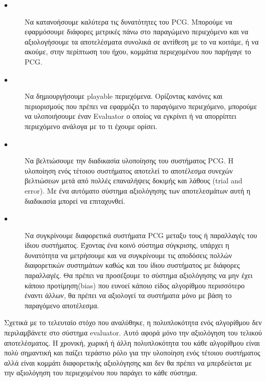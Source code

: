 \begin{description}
  \item[$\bullet$] Nα κατανοήσουμε καλύτερα τις δυνατότητες του PCG. Mπορούμε να εφαρμόσουμε διάφορες μετρικές πάνω στο παραγώμενο περιεχόμενο και να αξιολογήσουμε τα αποτελέσματα συνολικά σε αντίθεση με το να κοιτάμε, ή να ακούμε, στην περίπτωση του ήχου, κομμάτια περιεχομένου που παρήγαγε το PCG.
    \item[$\bullet$] Nα δημιουργήσουμε playable περιεχόμενα. Ορίζοντας κανόνες και περιορισμούς που πρέπει να εφαρμόζει το παραγόμενο περιεχόμενο, μπορούμε να υλοποιήσουμε έναν Εvaluator ο οποίος να εγκρίνει ή να απορρίπτει περιεχόμενο ανάλογα με το τι έχουμε ορίσει.
    \item[$\bullet$] Nα βελτιώσουμε την διαδικασία υλοποίησης του συστήματος PCG. Η υλοποίηση ενός τέτοιου συστήματος αποτελεί το αποτέλεσμα συνεχών βελτιώσεων μετά από πολλές επαναλήψεις δοκιμής και λάθους (trial and error). Με ένα αυτόματο σύστημα αξιολόγησης των αποτελεσμάτων αυτή η διαδικασία μπορεί να επιταχυνθεί.
    \item[$\bullet$] Nα συγκρίνουμε διαφορετικά συστήματα PCG μεταξυ τους ή παραλλαγές του ίδιου συστήματος. Έχοντας ένα κοινό σύστημα σύγκρισης, υπάρχει η δυνατότητα να μετρήσουμε και να συγκρίνουμε τις αποδόσεις πολλών διαφορετικών συστημάτων καθώς και του ίδιου συστήματος με διάφορες παραλλαγές. Θα πρέπει να προσέξουμε το σύστημα αξιολόγησης να μην έχει κάποιο προτίμηση(bias) που ευνοεί κάποιο είδος αλγορίθμου περισσότερο έναντι άλλων, θα πρέπει να αξιολογεί τα συστήματα μόνο με βάση το παραγόμενο αποτέλεσμα.
\end{description}
\par
Σχετικά με το τελευταίο στόχο που αναλύθηκε, η πολυπλοκότητα ενός αλγορίθμου δεν περιλαμβάνετε στο σύστημα evaluator. Αυτό αφορά μόνο την αξιολόγηση του τελικού αποτελέσματος. Η χρονική, χωρική ή άλλη πολυπλοκότητα του κάθε αλγορίθμου είναι πολύ σημαντική και παίζει τεράστιο ρόλο για την υλοποίηση ενός τέτοιου συστήματος αλλά είναι κομμάτι διαφορετικής αξιολόγησης και δεν θα πρέπει να μπερδεύεται με την αξιολόγηση του περιεχομένου που παράγει το κάθε σύστημα.

